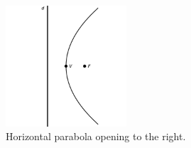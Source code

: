 \begin{figure}[h]
	\begin{center}
			\includegraphics[width=0.4\textwidth]{fig_algebraic_28}
	\caption{Horizontal parabola opening to the right.}
	\label{fig_algebraic_28}
	\end{center}
\end{figure}

